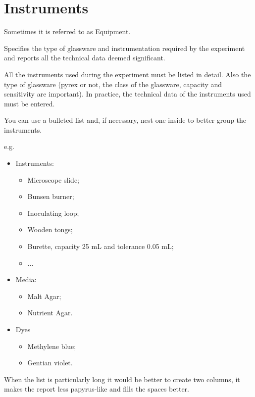 \section{Instruments}
Sometimes it is referred to as Equipment.

Specifies the type of glassware and instrumentation required by the experiment and reports all the technical data deemed significant.

All the instruments used during the experiment must be listed in detail. Also the type of glassware (pyrex or not, the class of the glassware, capacity and sensitivity are important).
In practice, the technical data of the instruments used must be entered.

You can use a bulleted list and, if necessary, nest one inside to better group the instruments.

e.g.
\begin{itemize}
    \item Instruments:
    \begin{itemize}
        \item Microscope slide;
        \item Bunsen burner;
        \item Inoculating loop;
        \item Wooden tongs;
        \item Burette, capacity 25 mL and tolerance 0.05 mL;
        \item ...
    \end{itemize}
    \item Media:
    \begin{itemize}
    \item Malt Agar;
    \item Nutrient Agar.
    \end{itemize}
    \item Dyes
    \begin{itemize}
        \item Methylene blue;
        \item Gentian violet.
    \end{itemize}
\end{itemize}

When the list is particularly long it would be better to create two columns, it makes the report less papyrus-like and fills the spaces better.

